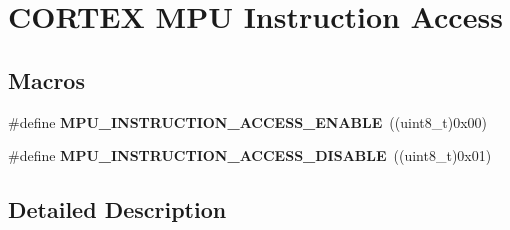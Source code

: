 \hypertarget{group___c_o_r_t_e_x___m_p_u___instruction___access}{}\section{C\+O\+R\+T\+EX M\+PU Instruction Access}
\label{group___c_o_r_t_e_x___m_p_u___instruction___access}
\subsection*{Macros}
\begin{DoxyCompactItemize}
\item 
\#define {\bfseries M\+P\+U\+\_\+\+I\+N\+S\+T\+R\+U\+C\+T\+I\+O\+N\+\_\+\+A\+C\+C\+E\+S\+S\+\_\+\+E\+N\+A\+B\+LE}~((uint8\+\_\+t)0x00)\hypertarget{group___c_o_r_t_e_x___m_p_u___instruction___access_ga86e79dad0b71bf2a5d0b491f9f66ccaa}{}\label{group___c_o_r_t_e_x___m_p_u___instruction___access_ga86e79dad0b71bf2a5d0b491f9f66ccaa}

\item 
\#define {\bfseries M\+P\+U\+\_\+\+I\+N\+S\+T\+R\+U\+C\+T\+I\+O\+N\+\_\+\+A\+C\+C\+E\+S\+S\+\_\+\+D\+I\+S\+A\+B\+LE}~((uint8\+\_\+t)0x01)\hypertarget{group___c_o_r_t_e_x___m_p_u___instruction___access_ga6f459c48d81632c370c5eafdfb4d3b1b}{}\label{group___c_o_r_t_e_x___m_p_u___instruction___access_ga6f459c48d81632c370c5eafdfb4d3b1b}

\end{DoxyCompactItemize}


\subsection{Detailed Description}
